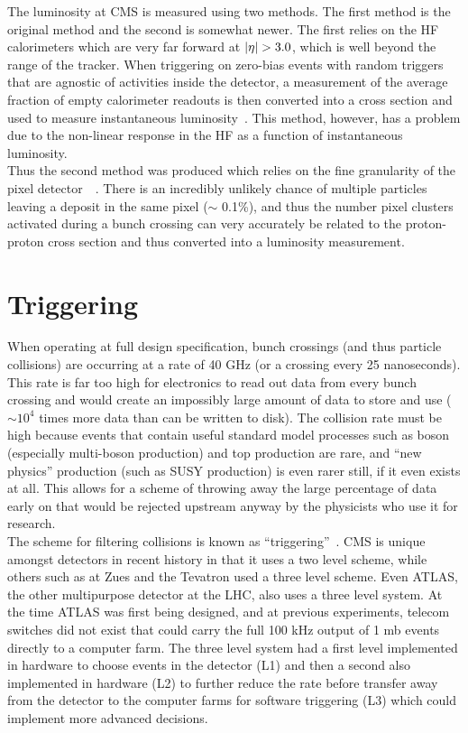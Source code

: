The luminosity at CMS is measured using two methods. The first method is the original method and the second is somewhat newer. The first relies on the HF calorimeters which are very far forward at $|\eta| > 3.0$, which is well beyond the range of the tracker. When triggering on zero-bias events with random triggers that are agnostic of activities inside the detector, a measurement of the average fraction of empty calorimeter readouts is then converted into a cross section and used to measure instantaneous luminosity~\cite{lumi11}. This method, however, has a problem due to the non-linear response in the HF as a function of instantaneous luminosity.\\

Thus the second method was produced which relies on the fine granularity of the pixel detector~\cite{lumi12}~\cite{lumi12up}. There is an incredibly unlikely chance of multiple particles leaving a deposit in the same pixel ($\sim$ 0.1\%), and thus the number pixel clusters activated during a bunch crossing can very accurately be related to the proton-proton cross section and thus converted into a luminosity measurement.\\
				
	\section{Triggering}       
	When operating at full design specification, bunch crossings (and thus particle collisions) are occurring at a rate of 40 GHz (or a crossing every 25 nanoseconds). This rate is far too high for electronics to read out data from every bunch crossing and would create an impossibly large amount of data to store and use ($\sim 10^4$ times more data than can be written to disk). The collision rate must be high because events that contain useful standard model processes such as boson (especially multi-boson production) and top production are rare, and ``new physics'' production (such as SUSY production) is even rarer still, if it even exists at all. This allows for a scheme of throwing away the large percentage of data early on that would be rejected upstream anyway by the physicists who use it for research.\\
	
	The scheme for filtering collisions is known as ``triggering''~\cite{triggertdr1}. CMS is unique amongst detectors in recent history in that it uses a two level scheme, while others such as at Zues and the Tevatron used a three level scheme. Even ATLAS, the other multipurpose detector at the LHC, also uses a three level system. At the time ATLAS was first being designed, and at previous experiments, telecom switches did not exist that could carry the full 100 kHz output of 1 mb events directly to a computer farm. The three level system had a first level implemented in hardware to choose events in the detector (L1) and then a second also implemented in hardware (L2) to further reduce the rate before transfer away from the detector to the computer farms for software triggering (L3) which could implement more advanced decisions.\\
	
